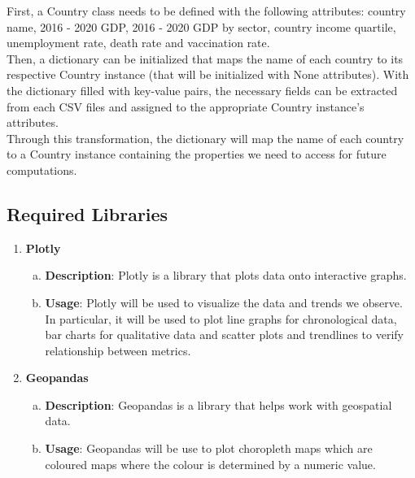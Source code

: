 \documentclass[fontsize=11pt]{article}
\begin{document}
    \noindent First, a Country class needs to be defined  with the following attributes:  country name, 2016 - 2020 GDP, 2016 - 2020 GDP by sector, country income quartile, unemployment rate, death rate and vaccination rate. \\

    \noindent Then, a dictionary can be initialized that maps the name of each country to its respective Country instance (that will be initialized with None attributes). With the dictionary filled with key-value pairs, the necessary fields can be extracted from each CSV files and assigned to the appropriate Country instance’s attributes. \\

    \noindent Through this transformation, the dictionary will map the name of each country to a Country instance containing the properties we need to access for future computations. \\







    \subsection*{Required Libraries}
    \begin{enumerate}
        \item \textbf{Plotly}
        \begin{enumerate}[(a)]
            \item \textbf{Description}: Plotly is a library that plots data onto interactive graphs.
            \item \textbf{Usage}: Plotly will be used to visualize the data and trends we observe. In particular, it will be used to plot line graphs for chronological data, bar charts for qualitative data and scatter plots and trendlines to verify relationship between metrics.
        \end{enumerate}
        \item \textbf{Geopandas}
        \begin{enumerate}[(a)]
            \item \textbf{Description}: Geopandas is a library that helps work with geospatial data.
            \item \textbf{Usage}: Geopandas will be use to plot choropleth maps which are coloured maps where the colour is determined by a numeric value.
       \end{enumerate}
    \end{enumerate}
\end{document}
